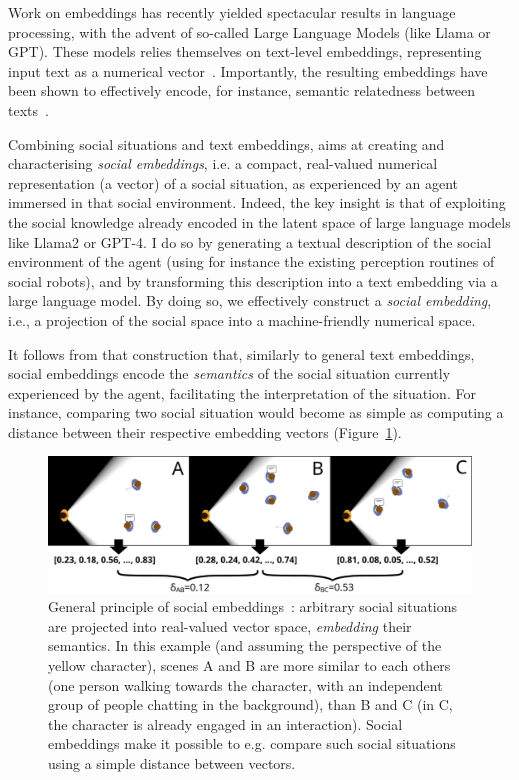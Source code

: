 Work on embeddings has recently yielded spectacular results in language
processing, with the advent of so-called Large Language Models (like Llama or
GPT). These models relies themselves on text-level embeddings, representing
input text as a numerical
vector~\cite{reimers2019sentencebert,muennighoff2022sgpt}. Importantly, the
resulting embeddings have been shown to effectively encode, for instance,
semantic relatedness between texts~\cite{thakur2021beir}.

Combining social situations and text embeddings, \project aims at creating and
characterising \emph{social embeddings}, i.e. a compact, real-valued numerical
representation (a vector) of a social situation, as experienced by an agent
immersed in that social environment. 
Indeed, the key insight is that of
exploiting the social knowledge already encoded in the latent space of large
language models like Llama2 or GPT-4. I do so by generating a textual
description of the social environment of the agent (using for instance the
existing perception routines of social robots), and by transforming this
description into a text embedding via a large language model.  By doing so, we
effectively construct a \emph{social embedding}, i.e., a projection of the
social space into a machine-friendly numerical space.

It follows from that construction that, similarly to general text embeddings,
social embeddings encode the \emph{semantics} of the social situation currently
experienced by the agent, facilitating the interpretation of the situation. For
instance, comparing two social situation would become as simple as computing a
distance between their respective embedding vectors
(Figure~\ref{fig:social-embeddings}).


\begin{figure}[H]
    \centering
    \includegraphics[width=0.9\linewidth]{figs/social-embeddings}
    \caption{General principle of social embeddings~\cite{lemaignan2024social}: arbitrary social situations
    are projected into real-valued vector space, \emph{embedding} their
    semantics. In this example (and assuming the perspective of the yellow
    character), scenes A and B  are more similar to each others (one person
    walking towards the character, with an independent group of people chatting
    in the background), than B and C (in C, the character is already engaged in
    an interaction).  Social embeddings make it possible to e.g. compare such
    social situations using a simple distance between vectors.}

    \label{fig:social-embeddings}
\end{figure}


